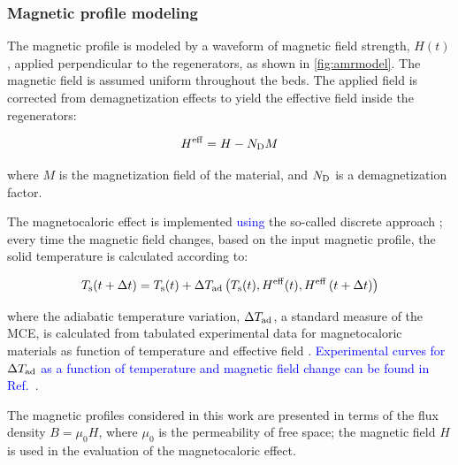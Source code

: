 \documentclass[referee]{svjour3}
\begin{document}

\subsubsection{Magnetic profile modeling}
\label{sec:how-magnetic-profile}

The magnetic profile is modeled by a waveform of magnetic field strength, $H(t)$, applied perpendicular to the regenerators, as shown in \autoref{fig:amrmodel}. The magnetic field is assumed uniform throughout the beds. The applied field is corrected from demagnetization effects to yield the effective field inside the regenerators:

\begin{equation}
  \label{eq:6}
  H^{\mathrm{eff}} = H - N_{\mathrm{D}} M
\end{equation}


\noindent where $M$ is the magnetization field of the material, and $N_{\mathrm{D}}$ is a demagnetization factor.

The magnetocaloric effect is implemented \textcolor{blue}{using} the so-called discrete approach \cite{bib:nielsen11_review}; every time the magnetic field changes, based on the input magnetic profile, the solid temperature is calculated according to:

\begin{equation}
  \label{eq:89}
  T_{\mathrm{s}}(t + \Delta{}t) = T_{\mathrm{s}}(t) + \Delta{}T_{\mathrm{ad}} \left(T_{\mathrm{s}}(t),H^{\mathrm{eff}}(t),H^{\mathrm{eff}}\left(t + \Delta{}t\right)\right)
\end{equation}



\noindent where the adiabatic temperature variation, $\Delta{}T_{\mathrm{ad}}$, a standard measure of the MCE, is calculated from tabulated experimental data for magnetocaloric materials as function of temperature and effective field \cite{bib:trevizoli16_perfor_model}. \textcolor{blue}{Experimental curves for  $\Delta{}T_{\mathrm{ad}}$ as a function of temperature and magnetic field change can be found in Ref.~\cite{bib:bahl09}}.

The magnetic profiles considered in this work are presented in terms of the flux density $B = \mu_0 H$, where $\mu_0$ is the permeability of free space; the magnetic field $H$ is used in the evaluation of the magnetocaloric effect.
\end{document}
